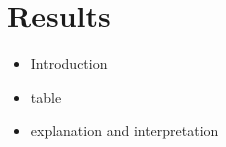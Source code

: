 \section{Results}

\begin{itemize}
    \item Introduction
    \item table
    \item explanation and interpretation
\end{itemize}



